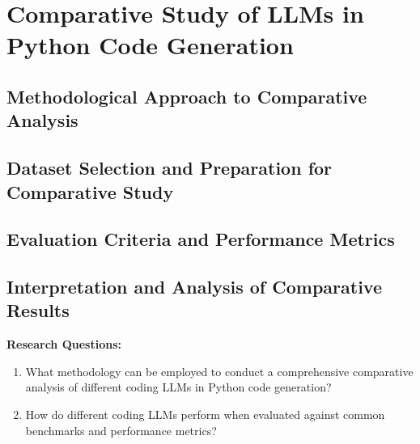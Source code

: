 
\chapter{Comparative Study of LLMs in Python Code Generation}
\label{chap:comparative_study}
\pagestyle{fancy}

\section{Methodological Approach to Comparative Analysis}

\section{Dataset Selection and Preparation for Comparative Study}


\section{Evaluation Criteria and Performance Metrics}

\section{Interpretation and Analysis of Comparative Results}

\textbf{Research Questions:}
\begin{enumerate}
    \item What methodology can be employed to conduct a comprehensive comparative analysis of different coding LLMs in Python code generation?
    \item How do different coding LLMs perform when evaluated against common benchmarks and performance metrics?
\end{enumerate}
